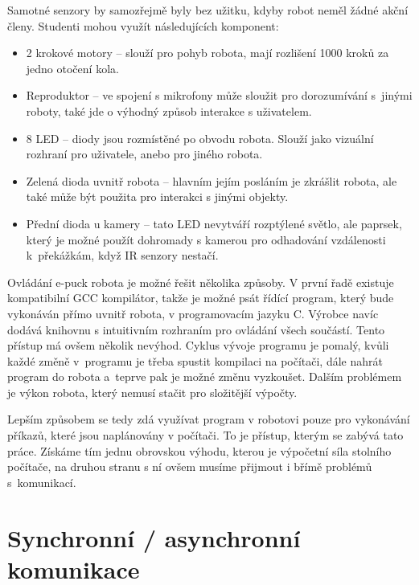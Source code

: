     Samotné senzory by samozřejmě byly bez užitku, kdyby robot neměl žádné
    akční členy. Studenti mohou využít následujících komponent:
    \begin{itemize}
        \item 2 krokové motory -- slouží pro pohyb robota, mají rozlišení 1000
        kroků za jedno otočení kola.

        \item Reproduktor -- ve spojení s mikrofony může sloužit pro
        dorozumívání s~jinými roboty, také jde o výhodný způsob interakce s
        uživatelem.

        \item 8 LED -- diody jsou rozmístěné po obvodu robota. Slouží jako
        vizuální rozhraní pro uživatele, anebo pro jiného robota.

        \item Zelená dioda uvnitř robota -- hlavním jejím posláním je zkrášlit
        robota, ale také může být použita pro interakci s jinými objekty.

        \item Přední dioda u kamery -- tato LED nevytváří rozptýlené světlo,
        ale paprsek, který je možné použít dohromady s kamerou pro odhadování
        vzdálenosti k~překážkám, když IR senzory nestačí.
    \end{itemize}

    Ovládání e-puck robota je možné řešit několika způsoby. V první řadě
    existuje kompatibilní GCC kompilátor, takže je možné psát řídící program,
    který bude vykonáván přímo uvnitř robota, v programovacím jazyku C. Výrobce
    navíc dodává knihovnu s intuitivním rozhraním pro ovládání všech součástí.
    Tento přístup má ovšem několik nevýhod. Cyklus vývoje programu je pomalý,
    kvůli každé změně v~programu je třeba spustit kompilaci na počítači, dále
    nahrát program do robota a~teprve pak je možné změnu vyzkoušet. Dalším
    problémem je výkon robota, který nemusí stačit pro složitější výpočty.

    Lepším způsobem se tedy zdá využívat program v robotovi pouze pro
    vykonávání příkazů, které jsou naplánovány v počítači. To je přístup,
    kterým se zabývá tato práce. Získáme tím jednu obrovskou výhodu, kterou je
    výpočetní síla stolního počítače, na druhou stranu s ní ovšem musíme
    přijmout i břímě problémů s~komunikací.

    \section{Synchronní / asynchronní komunikace}
    \label{sync/async}

